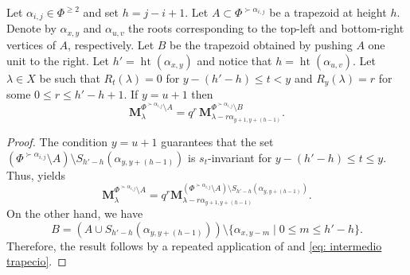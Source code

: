 \begin{corollary} \label{coro: push pyramid to the right}
    Let $\alpha_{i,j} \in \Phi^{\geq 2}$ and set $h = j - i + 1$. 
    Let $A \subset \Phi^{\succ \alpha_{i,j}}$ be a trapezoid at height $h$. 
    Denote by $\alpha_{x,y}$ and $\alpha_{u,v}$ the roots corresponding to the top-left and bottom-right vertices of  $A$, respectively.
    Let $B$ be the trapezoid obtained by pushing $A$ one unit to the right. 
   Let $h' = \operatorname{ht}(\alpha_{x,y})$ and notice that $h=\operatorname{ht}(\alpha_{u,v})$. 
    Let $\lambda \in X$ be such that $R_{t}(\lambda) = 0$ for $y-(h'-h) \leq t < y$ and $R_{y}(\lambda) = r$ for some $0 \leq r \leq h' - h +1$.
   If  $y=u+1$ then 
    \begin{equation}
        \mathbf{M}^{ \Phi^{\succ \alpha_{i,j}} \setminus A}_\lambda
        =
        q^{r} \,
        \mathbf{M}^{\Phi^{\succ \alpha_{i,j}} \setminus B}_{\lambda - r \alpha_{y+1,y +(h-1)}}.
    \end{equation} 
\end{corollary}


\begin{proof}
The condition $y=u+1$ guarantees that the set $(\Phi^{\succ \alpha_{i,j}} \setminus  A) \setminus S_{h'-h}(\alpha_{y,y+(h-1)})$ is $s_t$-invariant for   $   y-(h'-h)  \leq t \leq y$. 
Thus,  yields
\begin{equation}\label{eq: intermedio trapecio}
      \mathbf{M}^{ \Phi^{\succ \alpha_{i,j}} \setminus A}_\lambda = q^r   \mathbf{M}^{ (\Phi^{\succ \alpha_{i,j}} \setminus A) \setminus S_{h'-h}(\alpha_{y,y+(h-1)})}_{\lambda -  r\alpha_{y+1,y+(h-1)}} . 
\end{equation}
On the other hand,  we have
\begin{equation}
    B= (A\cup S_{h'-h}(\alpha_{y,y+(h-1)})) \setminus \{\alpha_{x,y-m} \mid  0\leq  m\leq h'-h \}  .
\end{equation}
Therefore, the result follows by a repeated application of  and \eqref{eq: intermedio trapecio}.
\end{proof}


